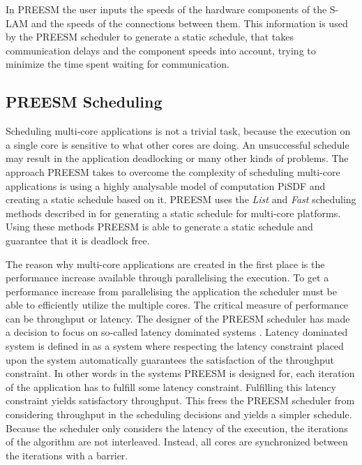 In PREESM the user inputs the speeds of the hardware components of the S-LAM and the speeds of the connections between them. This information is used by the PREESM scheduler to generate a static schedule, that takes communication delays and the component speeds into account, trying to minimize the time spent waiting for communication.~\cite{pelcat2009system}

\subsection{PREESM Scheduling}
\label{sec:preesm-scheduling}
Scheduling multi-core applications is not a trivial task, because the execution on a single core is sensitive to what other cores are doing. An unsuccessful schedule may result in the application deadlocking or many other kinds of problems. The approach PREESM takes to overcome the complexity of scheduling multi-core applications is using a highly analysable model of computation PiSDF and creating a static schedule based on it. PREESM uses the \textit{List} and \textit{Fast} scheduling methods described in \cite{kwok1997high} for generating a static schedule for multi-core platforms. Using these methods PREESM is able to generate a static schedule and guarantee that it is deadlock free.

The reason why multi-core applications are created in the first place is the performance increase available through parallelising the execution. To get a performance increase from parallelising the application the scheduler must be able to efficiently utilize the multiple cores. The critical measure of performance can be throughput or latency. The designer of the PREESM scheduler has made a decision to focus on so-called latency dominated systems \cite{pelcat2014preesm}. Latency dominated system is defined in \cite{ghamarian2006throughput} as a system where respecting the latency constraint placed upon the system automatically guarantees the satisfaction of the throughput constraint. In other words in the systems PREESM is designed for, each iteration of the application has to fulfill some latency constraint. Fulfilling this latency constraint yields satisfactory throughput. This frees the PREESM scheduler from considering throughput in the scheduling decisions and yields a simpler schedule. Because the scheduler only considers the latency of the execution, the iterations of the algorithm are not interleaved. Instead, all cores are synchronized between the iterations with a barrier.~\cite{pelcat2014preesm}

